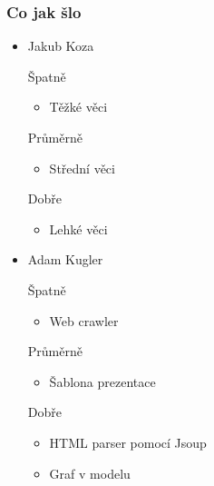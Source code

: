 \documentclass{beamer}
\begin{document}
\begin{frame}[allowframebreaks]\frametitle{Co jak šlo}
  \begin{itemize}
    \item Jakub Koza
     \begin{block}{Špatně} %
       \begin{itemize}
        \item Těžké věci
       \end{itemize}
     \end{block}
     \begin{block}{Průměrně} %
        \begin{itemize}
        \item Střední věci
       \end{itemize}
     \end{block}
     \begin{block}{Dobře} %
       \begin{itemize}
        \item Lehké věci
       \end{itemize}
     \end{block}
   
    \item Adam Kugler
      \begin{block}{Špatně} %
       \begin{itemize}
        \item Web crawler
       \end{itemize}
     \end{block}
     \begin{block}{Průměrně} %
        \begin{itemize}
        \item Šablona prezentace
       \end{itemize}
     \end{block}
     \begin{block}{Dobře} %
       \begin{itemize}
        \item HTML parser pomocí Jsoup
        \item Graf v modelu
       \end{itemize}
     \end{block}
  

\end{itemize}
\end{frame}
\end{document}
